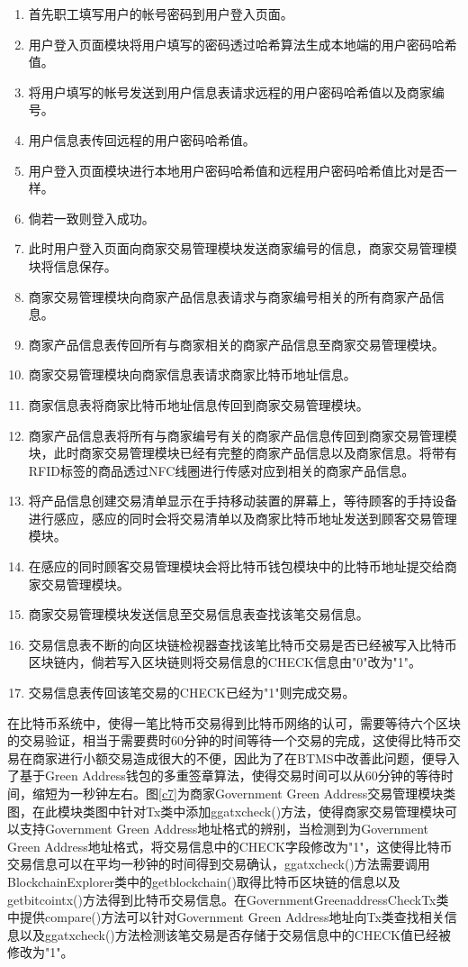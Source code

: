	\begin{enumerate}
	\item 首先职工填写用户的帐号密码到用户登入页面。
	\item 用户登入页面模块将用户填写的密码透过哈希算法生成本地端的用户密码哈希值。
	\item 将用户填写的帐号发送到用户信息表请求远程的用户密码哈希值以及商家编号。
	\item 用户信息表传回远程的用户密码哈希值。
	\item 用户登入页面模块进行本地用户密码哈希值和远程用户密码哈希值比对是否一样。
	\item 倘若一致则登入成功。
	\item 此时用户登入页面向商家交易管理模块发送商家编号的信息，商家交易管理模块将信息保存。
	\item 商家交易管理模块向商家产品信息表请求与商家编号相关的所有商家产品信息。
	\item 商家产品信息表传回所有与商家相关的商家产品信息至商家交易管理模块。
	\item 商家交易管理模块向商家信息表请求商家比特币地址信息。
	\item 商家信息表将商家比特币地址信息传回到商家交易管理模块。
	\item 商家产品信息表将所有与商家编号有关的商家产品信息传回到商家交易管理模块，此时商家交易管理模块已经有完整的商家产品信息以及商家信息。将带有RFID标签的商品透过NFC线圈进行传感对应到相关的商家产品信息。
	\item 将产品信息创建交易清单显示在手持移动装置的屏幕上，等待顾客的手持设备进行感应，感应的同时会将交易清单以及商家比特币地址发送到顾客交易管理模块。

	\item 在感应的同时顾客交易管理模块会将比特币钱包模块中的比特币地址提交给商家交易管理模块。
	\item 商家交易管理模块发送信息至交易信息表查找该笔交易信息。
	\item 交易信息表不断的向区块链检视器查找该笔比特币交易是否已经被写入比特币区块链内，倘若写入区块链则将交易信息的CHECK信息由"0"改为"1"。
	\item 交易信息表传回该笔交易的CHECK已经为"1"则完成交易。
	
	\end{enumerate}

	在比特币系统中，使得一笔比特币交易得到比特币网络的认可，需要等待六个区块的交易验证，相当于需要费时60分钟的时间等待一个交易的完成，这使得比特币交易在商家进行小额交易造成很大的不便，因此为了在BTMS中改善此问题，便导入了基于Green Address钱包的多重签章算法，使得交易时间可以从60分钟的等待时间，缩短为一秒钟左右。图\ref{c7}为商家Government Green Address交易管理模块类图，在此模块类图中针对Tx类中添加ggatxcheck()方法，使得商家交易管理模块可以支持Government Green Address地址格式的辨别，当检测到为Government Green Address地址格式，将交易信息中的CHECK字段修改为"1"，这使得比特币交易信息可以在平均一秒钟的时间得到交易确认，ggatxcheck()方法需要调用BlockchainExplorer类中的getblockchain()取得比特币区块链的信息以及getbitcointx()方法得到比特币交易信息。在GovernmentGreenaddressCheckTx类中提供compare()方法可以针对Government Green Address地址向Tx类查找相关信息以及ggatxcheck()方法检测该笔交易是否存储于交易信息中的CHECK值已经被修改为"1"。

